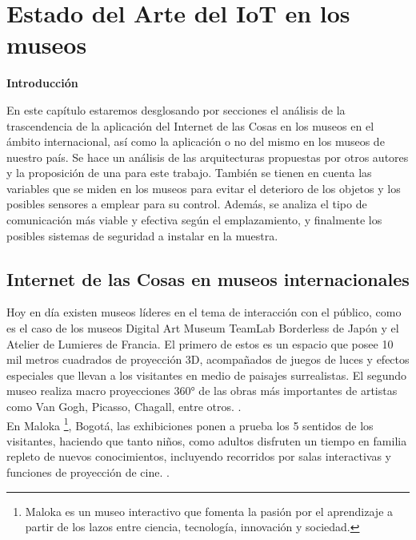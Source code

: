 \chapter{Estado del Arte del IoT en los museos} \label{cap:aproxTeoricas}

        \textbf{\Large Introducción}\newline

        En este capítulo estaremos desglosando por secciones el análisis de la trascendencia de la aplicación del Internet de las Cosas en los museos en el ámbito internacional, así como la aplicación o no del mismo en los museos de nuestro país.
        Se hace un análisis de las arquitecturas propuestas por otros autores y la proposición de una para este trabajo.
        También se tienen en cuenta las variables que se miden en los museos para evitar el deterioro de los objetos y los posibles sensores a emplear para su control.
        Además, se analiza el tipo de comunicación más viable y efectiva según el emplazamiento, y finalmente los posibles sistemas de seguridad a instalar en la muestra.
    
    \section{Internet de las Cosas en museos internacionales}\label{sec:iotMundo}
        
        Hoy en día existen museos líderes en el tema de interacción con el público, como es el caso de los museos Digital Art Museum TeamLab Borderless de Japón y el Atelier de Lumieres de Francia. El primero de estos es un espacio que posee 10 mil metros cuadrados de proyección 3D, acompañados de juegos de luces y efectos especiales que llevan a los visitantes en medio de paisajes surrealistas. El segundo museo realiza macro proyecciones 360° de las obras más importantes de artistas como Van Gogh, Picasso, Chagall, entre otros. \cite{museoInterSalaLimpia}.\\

        En Maloka \footnote{Maloka es un museo interactivo que fomenta la pasión por el aprendizaje a partir de los lazos entre ciencia, tecnología, innovación y sociedad.}, Bogotá, las exhibiciones ponen a prueba los 5 sentidos de los visitantes, haciendo que tanto niños, como adultos disfruten un tiempo en familia repleto de nuevos conocimientos, incluyendo recorridos por salas interactivas y funciones de proyección de cine. \cite{maloka}.\\

